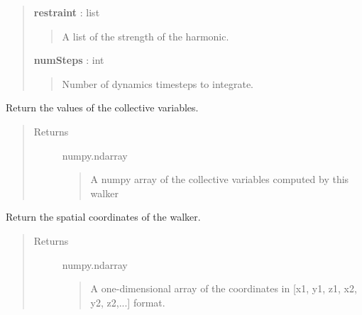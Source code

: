 \documentclass[letterpaper,10pt,english]{sphinxmanual}
\begin{document}
\begin{fulllineitems}
\begin{fulllineitems}
\begin{quote}
\begin{description}
\textbf{restraint} : list
\begin{quote}

A list of the strength of the harmonic.
\end{quote}

\textbf{numSteps} : int
\begin{quote}

Number of dynamics timesteps to integrate.
\end{quote}

\end{description}\end{quote}

\end{fulllineitems}


\begin{fulllineitems}
\label{walker_api/walker_api.doc:walker_api.lammps_walker.Lammps.get_colvars}
Return the values of the collective variables.
\begin{quote}\begin{description}
\item[{Returns}] \leavevmode
numpy.ndarray
\begin{quote}

A numpy array of the collective variables computed by this walker
\end{quote}

\end{description}\end{quote}

\end{fulllineitems}


\begin{fulllineitems}
\label{walker_api/walker_api.doc:walker_api.lammps_walker.Lammps.get_position}
Return the spatial coordinates of the walker.
\begin{quote}\begin{description}
\item[{Returns}] \leavevmode
numpy.ndarray
\begin{quote}

A one-dimensional array of the coordinates in {[}x1, y1, z1, x2, y2, z2,...{]} format.
\end{quote}


\end{description}
\end{quote}
\end{fulllineitems}
\end{fulllineitems}
\end{document}
